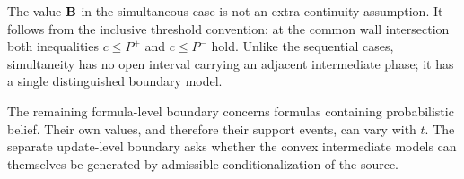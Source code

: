 The value \(\mathbf{B}\) in the simultaneous case is not an extra continuity
assumption. It follows from the inclusive threshold convention: at the common
wall intersection both inequalities \(c\leq P^+\) and \(c\leq P^-\) hold.
Unlike the sequential cases, simultaneity has no open interval carrying an
adjacent intermediate phase; it has a single distinguished boundary model.

The remaining formula-level boundary concerns formulas containing
probabilistic belief. Their own values, and therefore their support events, can
vary with \(t\). The separate update-level boundary asks whether the convex
intermediate models can themselves be generated by admissible
conditionalization of the source.
